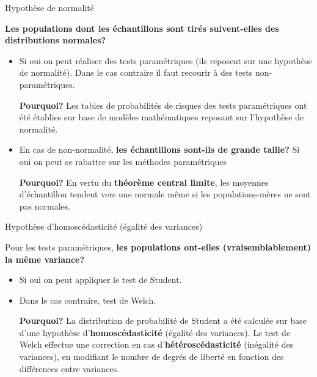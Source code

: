 \documentclass[ignorenonframetext,]{beamer}
\begin{document}
\begin{frame}{Hypothèse de normalité}
\protect\hypertarget{hypothuxe8se-de-normalituxe9}{}

\textbf{Les populations dont les échantillons sont tirés suivent-elles
des distributions normales?}

\begin{itemize}
\item
  Si oui on peut réaliser des tests paramétriques (ils reposent sur une
  hypothèse de normalité). Dans le cas contraire il faut recourir à des
  tests non-paramétriques.

  \textbf{Pourquoi?} Les tables de probabilités de risques des tests
  paramétriques ont été établies sur base de modèles mathématiques
  reposant sur l'hypothèse de normalité.
\item
  En cas de non-normalité, \textbf{les échantillons sont-ils de grande
  taille?} Si oui on peut se rabattre sur les méthodes paramétriques

  \textbf{Pourquoi?} En vertu du \textbf{théorème central limite}, les
  moyennes d'échantillon tendent vers une normale même si les
  populations-mères ne sont pas normales.
\end{itemize}

\end{frame}

\begin{frame}{Hypothèse d'homoscédasticité (égalité des variances)}
\protect\hypertarget{hypothuxe8se-dhomoscuxe9dasticituxe9-uxe9galituxe9-des-variances}{}

Pour les tests paramétriques, \textbf{les populations ont-elles
(vraisemblablement) la même variance? }

\begin{itemize}
\item
  Si oui on peut appliquer le test de Student.
\item
  Dans le cas contraire, test de Welch.

  \textbf{Pourquoi?} La distribution de probabilité de Student a été
  calculée sur base d'une hypothèse d'\textbf{homoscédasticité} (égalité
  des variances). Le test de Welch effectue une correction en cas
  d'\textbf{hétéroscédasticité} (inégalité des variances), en modifiant
  le nombre de degrés de liberté en fonction des différences entre
  variances.
\end{itemize}

\end{frame}
\end{document}
